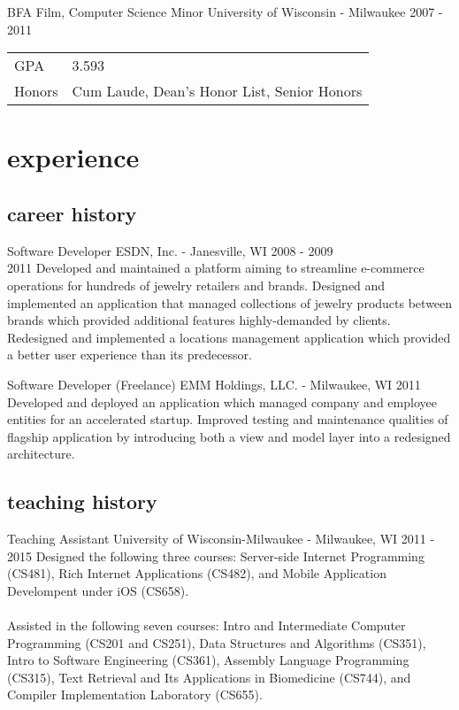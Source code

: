 \documentclass[]{fritz-resume}
\begin{document}
\entry
  {BFA Film, Computer Science Minor}
  {University of Wisconsin - Milwaukee}
  {2007 - 2011}
  {
    \begin{tabular}{>{\raggedleft}p{1.7cm} l}
      GPA    & 3.593 \\
      Honors & Cum Laude, Dean's Honor List, Senior Honors
    \end{tabular}
  }


\section{experience}

\subsection{career history}

\entry
  {Software Developer}
  {ESDN, Inc. - Janesville, WI \vspace{-3mm}}
  {2008 - 2009 \\ 2011}
  {
    Developed and maintained a platform aiming to streamline e-commerce operations for hundreds of jewelry retailers and brands. Designed and implemented an application that managed collections of jewelry products between brands which provided additional features highly-demanded by clients. Redesigned and implemented a locations management application which provided a better user experience than its predecessor.
  }

\entry
  {Software Developer (Freelance)}
  {EMM Holdings, LLC. - Milwaukee, WI}
  {2011}
  {
    Developed and deployed an application which managed company and employee entities for an accelerated startup. Improved testing and maintenance qualities of flagship application by introducing both a view and model layer into a redesigned architecture.
  }

\subsection{teaching history}

\entry
  {Teaching Assistant}
  {University of Wisconsin-Milwaukee - Milwaukee, WI}
  {2011 - 2015}
  {
    Designed the following three courses: Server-side Internet Programming (CS481), Rich Internet Applications (CS482), and Mobile Application Develompent under iOS (CS658). \\\\ Assisted in the following seven courses: Intro and Intermediate Computer Programming (CS201 and CS251), Data Structures and Algorithms (CS351), Intro to Software Engineering (CS361), Assembly Language Programming (CS315), Text Retrieval and Its Applications in Biomedicine (CS744), and Compiler Implementation Laboratory (CS655).
  }


\end{document}
